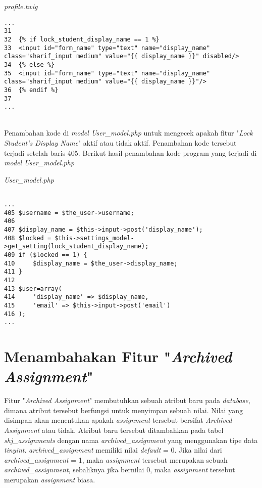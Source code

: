 \textit{profile.twig}
\begin{lstlisting}[basicstyle=\ttfamily, frame=single,
columns=fullflexible, keepspaces=true, breaklines=true]
...
31
32	{% if lock_student_display_name == 1 %}
33	<input id="form_name" type="text" name="display_name" class="sharif_input medium" value="{{ display_name }}" disabled/>
34	{% else %}
35	<input id="form_name" type="text" name="display_name" class="sharif_input medium" value="{{ display_name }}"/>
36	{% endif %}
37
...
\end{lstlisting}
~\\
Penambahan kode di \textit{model User\_model.php} untuk mengecek apakah fitur "\textit{Lock Student's Display Name}" aktif atau tidak aktif. Penambahan kode tersebut terjadi setelah baris 405. Berikut hasil penambahan kode program yang terjadi di \textit{model User\_model.php}

\textit{User\_model.php}
\begin{lstlisting}[basicstyle=\ttfamily, frame=single,
columns=fullflexible, keepspaces=true, breaklines=true]

...
405	$username = $the_user->username;
406
407	$display_name = $this->input->post('display_name');
408	$locked = $this->settings_model->get_setting(lock_student_display_name);
409	if ($locked == 1) {
410		$display_name = $the_user->display_name;
411	}
412	
413	$user=array(
414		'display_name' => $display_name,
415		'email' => $this->input->post('email')
416	);
...
\end{lstlisting}

\section{Menambahakan Fitur "\textit{Archived Assignment}"}
\label{chap:arc}
Fitur "\textit{Archived Assignment}" membutuhkan sebuah atribut baru pada \textit{database}, dimana atribut tersebut berfungsi untuk menyimpan sebuah nilai. Nilai yang disimpan akan menentukan apakah \textit{assignment} tersebut bersifat \textit{Archived Assignment} atau tidak. Atribut baru tersebut  ditambahkan pada tabel \textit{shj\_assignments} dengan nama \textit{archived\_assignment} yang menggunakan tipe data \textit{tinyint}. \textit{archived\_assignment} memiliki nilai \textit{default} = 0. Jika nilai dari \textit{archived\_assignment} = 1, maka \textit{assignment} tersebut merupakan sebuah \textit{archived\_assignment}, sebaliknya jika bernilai 0, maka \textit{assignment} tersebut merupakan \textit{assignment} biasa.

